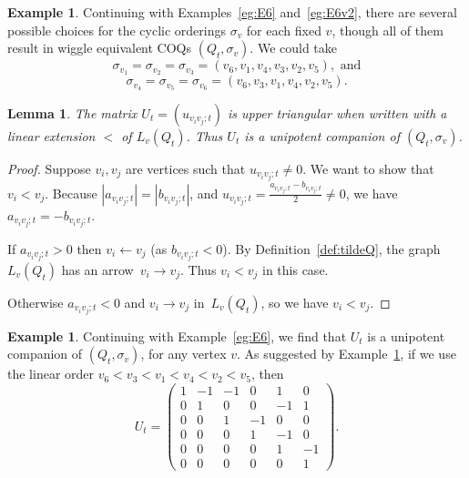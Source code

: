 \documentclass[11pt, letterpaper]{amsart}
\newcommand{\cS}[1]{{\noindent\textsf{\color{purple}$\blacksquare$~#1~$\blacksquare$}}}
\newtheorem{lemma}[theorem]{Lemma}
\theoremstyle{definition}
\newtheorem{example}[theorem]{Example}
\numberwithin{equation}{section}
\newcommand{\Qtmut}{Q_t}
\newcommand{\Lgraph}{L}
\begin{document}
\begin{example}
\label{eg:E6v3}
Continuing with Examples~\ref{eg:E6} and~\ref{eg:E6v2}, %
there are several possible choices for the cyclic orderings $\sigma_{v}$ for each fixed $v$, though all of them result in wiggle equivalent COQs $(\Qtmut, \sigma_v)$. 
We could take $$\sigma_{v_1} = \sigma_{v_2} = \sigma_{v_3} = (v_6, v_1, v_4, v_3, v_2, v_5), \text{ and}$$
$$\sigma_{v_4} = \sigma_{v_5} = \sigma_{v_6} = (v_6, v_3, v_1, v_4, v_2, v_5).$$
\end{example}

\begin{lemma}
\label{lem:U unipotent}
The matrix $U_t=(u_{v_i v_j;t})$ is upper triangular when written with a linear extension $<$ of $\Lgraph_{v}(\Qtmut)$. Thus $U_t$ is a unipotent companion of $(\Qtmut, \sigma_v)$.
\end{lemma}

\begin{proof}
Suppose $v_i,v_j$ are vertices such that $u_{v_i v_j;t} \neq 0$. 
We want to show that $v_i < v_j$.
Because $|a_{v_i v_j;t}| = |b_{v_i v_j;t}|$, and $u_{v_i v_j;t} = \frac{a_{v_i v_j;t} - b_{v_i v_j;t}}{2} \neq 0$, we have $a_{v_i v_j;t} = -b_{v_i v_j;t}$.

If $a_{v_i v_j;t}>0$ then $v_i \leftarrow v_j$ (as $b_{v_i v_j;t} < 0$).
By Definition~\ref{def:tildeQ}, the graph $\Lgraph_{v}(\Qtmut)$ has an arrow~${v_i \rightarrow v_j}$. 
Thus $v_i < v_j$ in this case.

Otherwise $a_{v_i v_j;t}<0$ and $v_i \rightarrow v_j$ in~$\Lgraph_{v}(\Qtmut)$, so we have $v_i < v_j$.
\end{proof}

\begin{example}
\label{eg:E6v4}
Continuing with Example~\ref{eg:E6}, we find that $U_t$ is a unipotent companion of $(\Qtmut, \sigma_{v})$, for any vertex $v$. 
As suggested by Example~\ref{eg:E6v3}, if we use the linear order $v_6 < v_3 < v_1< v_4< v_2< v_5$, then
$$ U_t = \begin{pmatrix}
1 & -1 & -1 & 0 & 1 & 0 \\
0 & 1 & 0 & 0 & -1 & 1 \\
0 & 0 & 1 & -1 & 0 & 0 \\
0 & 0 & 0 & 1 & -1 & 0 \\
0 & 0 & 0 & 0 & 1 & -1 \\
0 & 0 & 0 & 0 & 0 & 1
\end{pmatrix}.$$
\end{example}
\end{document}
